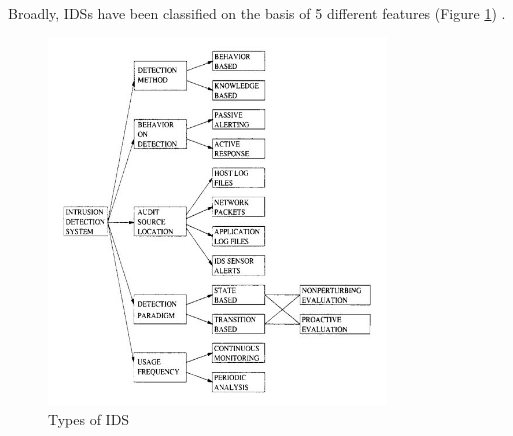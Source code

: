 \paragraph{}
Broadly, IDSs have been classified on the basis of 5 different features (Figure \ref{types_of_ids}) \cite{ids_taxonomy}.
\begin{figure}[h]
    \hfill\includegraphics[width=0.8\textwidth]{Chapter2/types_of_ids}\hspace*{\fill}
    \caption{Types of IDS}
    \label{types_of_ids}
\end{figure}
